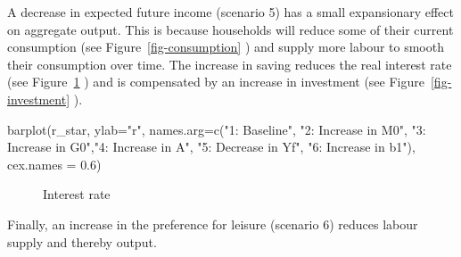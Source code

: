 \documentclass[
  letterpaper,
  DIV=11,
  numbers=noendperiod]{scrreprt}
\newenvironment{Shaded}{\begin{snugshade}}{\end{snugshade}}
\newcommand{\AttributeTok}[1]{\textcolor[rgb]{0.40,0.45,0.13}{#1}}
\newcommand{\FloatTok}[1]{\textcolor[rgb]{0.68,0.00,0.00}{#1}}
\newcommand{\FunctionTok}[1]{\textcolor[rgb]{0.28,0.35,0.67}{#1}}
\newcommand{\NormalTok}[1]{\textcolor[rgb]{0.00,0.23,0.31}{#1}}
\newcommand{\StringTok}[1]{\textcolor[rgb]{0.13,0.47,0.30}{#1}}
\begin{document}
A decrease in expected future income (scenario 5) has a small
expansionary effect on aggregate output. This is because households will
reduce some of their current consumption (see
Figure~\ref{fig-consumption} ) and supply more labour to smooth their
consumption over time. The increase in saving reduces the real interest
rate (see Figure~\ref{fig-interest_rate} ) and is compensated by an
increase in investment (see Figure~\ref{fig-investment} ).

\begin{Shaded}
\begin{Highlighting}[]
\FunctionTok{barplot}\NormalTok{(r\_star, }\AttributeTok{ylab=}\StringTok{"r"}\NormalTok{, }\AttributeTok{names.arg=}\FunctionTok{c}\NormalTok{(}\StringTok{"1: Baseline"}\NormalTok{, }\StringTok{"2: Increase in M0"}\NormalTok{, }\StringTok{"3: Increase in G0"}\NormalTok{,}\StringTok{"4: Increase in A"}\NormalTok{, }\StringTok{"5: Decrease in Yf"}\NormalTok{, }\StringTok{"6: Increase in b1"}\NormalTok{), }\AttributeTok{cex.names =} \FloatTok{0.6}\NormalTok{)}
\end{Highlighting}
\end{Shaded}

\begin{figure}[H]


\caption{\label{fig-interest_rate}Interest rate}

\end{figure}%

Finally, an increase in the preference for leisure (scenario 6) reduces
labour supply and thereby output.
\end{document}
